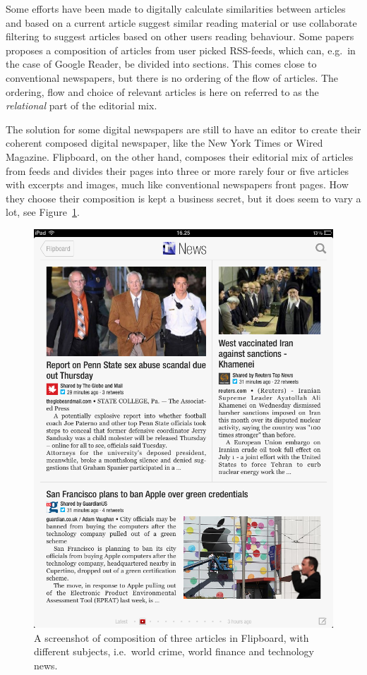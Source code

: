 Some efforts have been made to digitally calculate similarities between articles and based on a current article suggest similar reading material or use collaborate filtering to suggest articles based on other users reading behaviour. Some papers proposes a composition of articles from user picked RSS-feeds, which can, e.g.\ in the case of Google Reader, be divided into sections. This comes close to conventional newspapers, but there is no ordering of the flow of articles. The ordering, flow and choice of relevant articles is here on referred to as the \emph{relational} part of the editorial mix.

The solution for some digital newspapers are still to have an editor to create their coherent composed digital newspaper, like the New York Times or Wired Magazine. Flipboard, on the other hand, composes their editorial mix of articles from feeds and divides their pages  into three or more rarely four or five articles with excerpts and images, much like conventional newspapers front pages. How they choose their composition is kept a business secret, but it does seem to vary a lot, see Figure~\ref{fig:flipboard-screenshot}.

\begin{figure}[h!tb]
 	\begin{center}
 		\includegraphics[width=.45\textwidth]{img/flipboard2}
 	\end{center}
 	\caption{A screenshot of composition of three articles in Flipboard, with different subjects, i.e.\ world crime, world finance and technology news.}
 	\label{fig:flipboard-screenshot}
\end{figure}

